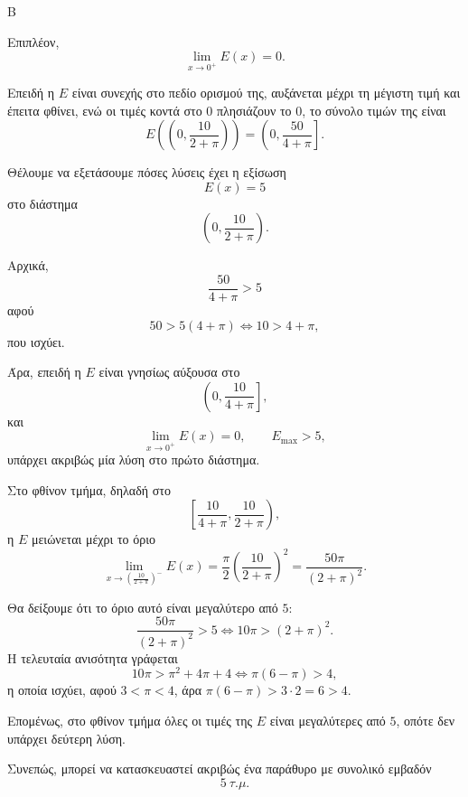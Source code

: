 \begin{thema}{Β}
\begin{erwthma}
Επιπλέον,
\[
\lim_{x\to 0^+}E(x)=0.
\]

Επειδή η $E$ είναι συνεχής στο πεδίο ορισμού της, αυξάνεται μέχρι τη μέγιστη τιμή και έπειτα φθίνει, ενώ οι τιμές κοντά στο $0$ πλησιάζουν το $0$, το σύνολο τιμών της είναι
\[
E\left(\left(0,\frac{10}{2+\pi}\right)\right)
=\left(0,\frac{50}{4+\pi}\right].
\]

\item Θέλουμε να εξετάσουμε πόσες λύσεις έχει η εξίσωση
\[
E(x)=5
\]
στο διάστημα
\[
\left(0,\frac{10}{2+\pi}\right).
\]

Αρχικά,
\[
\frac{50}{4+\pi}>5
\]
αφού
\[
50>5(4+\pi)\Leftrightarrow 10>4+\pi,
\]
που ισχύει.

Άρα, επειδή η $E$ είναι γνησίως αύξουσα στο
\[
\left(0,\frac{10}{4+\pi}\right],
\]
και
\[
\lim_{x\to0^+}E(x)=0,\qquad E_{\max}>5,
\]
υπάρχει ακριβώς μία λύση στο πρώτο διάστημα.

Στο φθίνον τμήμα, δηλαδή στο
\[
\left[\frac{10}{4+\pi},\frac{10}{2+\pi}\right),
\]
η $E$ μειώνεται μέχρι το όριο
\[
\lim_{x\to\left(\frac{10}{2+\pi}\right)^-}E(x)
=\frac{\pi}{2}\left(\frac{10}{2+\pi}\right)^2
=\frac{50\pi}{(2+\pi)^2}.
\]

Θα δείξουμε ότι το όριο αυτό είναι μεγαλύτερο από $5$:
\[
\frac{50\pi}{(2+\pi)^2}>5
\Leftrightarrow
10\pi>(2+\pi)^2.
\]
Η τελευταία ανισότητα γράφεται
\[
10\pi>\pi^2+4\pi+4
\Leftrightarrow
\pi(6-\pi)>4,
\]
η οποία ισχύει, αφού $3<\pi<4$, άρα $\pi(6-\pi)>3\cdot 2=6>4$.

Επομένως, στο φθίνον τμήμα όλες οι τιμές της $E$ είναι μεγαλύτερες από $5$, οπότε δεν υπάρχει δεύτερη λύση.

Συνεπώς, μπορεί να κατασκευαστεί ακριβώς ένα παράθυρο με συνολικό εμβαδόν
\[
5\ \tau.\mu.
\]
\end{erwthma}
\end{thema}



